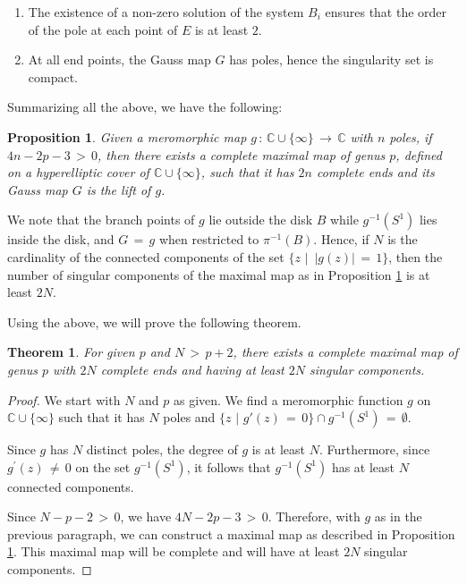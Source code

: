 \documentclass[12pt]{amsart}
\newtheorem{theorem}{Theorem}[section]
\newtheorem{prop}{Proposition}[section]
\numberwithin{equation}{section}
\begin{document}
\begin{enumerate}
\item The existence of a non-zero solution of the system \(B_i\) ensures that the order of the pole at
each point of \(E\) is at least \(2\).

\item At all end points, the Gauss map \(G\) has poles, hence the singularity set is compact.
\end{enumerate}

Summarizing all the above, we have the following:

\begin{prop}\label{prop:exsistece of maximal map}
Given a meromorphic map \(g\,:\, \mathbb{C} \cup \{\infty\}\, \longrightarrow\, \mathbb{C}\) with \(n\) poles, 
if \( 4n-2p-3 \,> \, 0\), then there exists a complete maximal map of genus \(p\), defined on a hyperelliptic cover 
of \(\mathbb{C} \cup \{\infty\}\), such that it has \(2n\) complete ends and its Gauss map \(G\) is the lift of 
\(g\).
\end{prop}

We note that the branch points of $g$ lie outside the disk \( B \) while \( g^{-1}(S^1) \) lies inside the disk, and 
\( G \,=\, g \) when restricted to \( \pi^{-1}(B) \). Hence, if \( N \) is the cardinality of the connected 
components of the set \( \{z \,\,\big\vert\,\,\, |g(z)| \,=\, 1\} \), then the number of singular components of the 
maximal map as in Proposition \ref{prop:exsistece of maximal map} is at least \( 2N \).

Using the above, we will prove the following theorem.

\begin{theorem}\label{thm:genus,singularity}
For given \( p \) and \( N \,>\, p + 2 \), there exists a complete maximal map of genus \( p \) with \( 2N \) complete ends and having at least \( 2N \) singular components.
\end{theorem}

\begin{proof}
We start with \( N \) and \( p \) as given. We find a meromorphic function \( g \) on \(\mathbb{C} \cup \{\infty\}\) such that it
has \( N \) poles and \(\{z \,\,\big\vert\,\, g'(z)\, =\, 0\} \cap g^{-1}(S^1) \,=\, \emptyset\).

Since \( g \) has \( N \) distinct poles, the degree of \( g \) is at least \( N \). Furthermore, since $g^\prime(z)\,\neq\, 0$ on the
set $g^{-1}(S^1)$, it follows that  \( g^{-1}(S^1) \) has at least \( N \) connected components.

Since \( N-p-2\,>\,0\), we have $4N-2p-3\,>\,0$. Therefore, with $g$ as in the previous paragraph, we can construct a maximal map as
described in Proposition \ref{prop:exsistece of maximal map}. This maximal map will be complete and will have at least \( 2N \)
singular components.
\end{proof}
\end{document}

